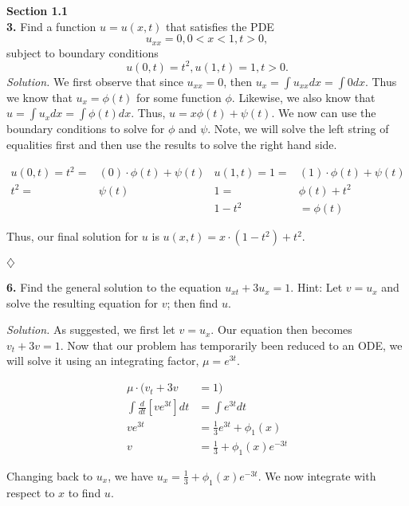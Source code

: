 \documentclass{article}
\begin{document}
\noindent
\textbf{Section 1.1}  
\\
\textbf{3.} Find a function \(   u=u(x,t)    \) that satisfies the PDE 
\[
u_{xx}=0, 	 0<x<1 , t>0, 
\]
subject to boundary conditions 
\[
u(0,t)=t^2,  u(1,t)=1 , t>0. 
\]
\textit{Solution.}  We first observe that since \(u_{xx}=0\), then \( u_{x} = \int u_{xx} dx = \int 0 dx \). Thus we know that
 \(u_{x}= \phi(t) \) for some function \( \phi \). Likewise, we also know that \(u = \int u_{x} dx= \int \phi(t) dx\). Thus, \( u = x\phi(t) + \psi(t) \). We now can use the boundary conditions to solve for \(\phi \) and \( \psi\). Note, we will solve the left string of equalities first and then use the results to solve the right hand side. 

\begin{align*}
  u(0,t) = t^2=& (0) \cdot \phi(t) + \psi(t)       &         u(1,t) = 1 =&  (1) \cdot \phi(t) + \psi(t)    \\
  t^2 =&  \psi(t)    &      1 =&  \phi(t)  + t^2 \\
  & &    1- t^2 &= \phi(t)
\end{align*}

\noindent
Thus, our final solution for \(u\) is \( u(x,t) = x\cdot (1-t^2) + t^2 \). 
\begin{flushright}
\( \diamondsuit \) 
\end{flushright}

\noindent
\textbf{6.} Find the general solution to the equation \(u_{xt} +3u_{x} = 1\). Hint: Let \(v=u_{x} \) and solve the resulting equation for \(v\); then find \(u\). 

\vspace{2mm}
\noindent
\textit{Solution.} As suggested, we first let \(v=u_x \). Our equation then becomes \(v_t +3v = 1\). Now that our problem has temporarily been reduced to an ODE, we will solve it using an integrating factor, \(\mu=e^{3t}\). 

\begin{align*}
\mu \cdot ( v_t + 3v &= 1 )  \\
\int \frac{d}{dt}[ ve^{3t}] dt &= \int e^{3t} dt  \\
 ve^{3t} &= \frac{1}{3}e^{3t} + \phi_{1}(x)  \\
 v &= \frac{1}{3} + \phi_{1}(x)e^{-3t}
\end{align*}






\noindent
Changing back to \(u_x\), we have \( u_x = \frac{1}{3} + \phi_{1}(x)e^{-3t} \). We now integrate with respect to 
\(x\) to find \(u\). 
\end{document}
